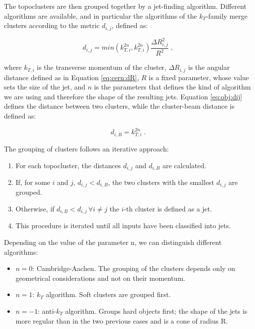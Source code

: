 The topoclusters are then grouped together by a jet-finding algorithm. Different algorithms are available, and in particular the algorithms of the $k_T$-family merge clusters according to the metric $d_{i,j}$, defined as:

\begin{equation}
d_{i,j} = min\left( k_{T,i}^{2n}, k_{T,i}^{2n}  \right) \frac{\Delta R_{i,j}^2}{R^2} \; ,
\label{eq:obj:dij}
\end{equation}

\noindent where $k_{T,i}$ is the transverse momentum of the cluster, $\Delta R_{i,j}$ is the angular distance defined as in Equation \ref{eq:cern:dR}, 
$R$ is a fixed parameter, whose value sets the size of the jet, and $n$ is the parameters that defines the kind of algorithm we are using 
and therefore the shape of the resulting jets. 
Equation \ref{eq:obj:dij} defines the distance between two clusters, while the cluster-beam distance is defined as:

\begin{equation}
d_{i,B} =  k_{T,i}^{2n} \; . \nonumber
\end{equation}

The grouping of clusters follows an iterative approach:
\begin{enumerate}
\item For each topocluster, the distances $d_{i,j}$ and $d_{i,B}$ are calculated.
\item If, for some $i$ and $j$, $d_{i,j} < d_{i,B}$, the two clusters with the smallest $d_{i,j}$ are grouped. 
\item Otherwise, if $d_{i,B} < d_{i,j} \, \forall i \neq j $ the $i$-th cluster is defined as a jet.
\item This procedure is iterated until all inputs have been classified into jets.
\end{enumerate}

\noindent Depending on the value of the parameter n, we can distinguish different algorithms:
\begin{itemize}
\item $n=0$: Cambridge-Aachen. The grouping of the clusters depends only on geometrical considerations and not on their momentum. 
\item $n=1$: $k_T$ algorithm. Soft clusters are grouped first.
\item $n=-1$: anti-$k_T$ algorithm. Groups hard objects first; the shape of the jets is more regular than in the two previous cases and is a cone of radius R.
\end{itemize}

